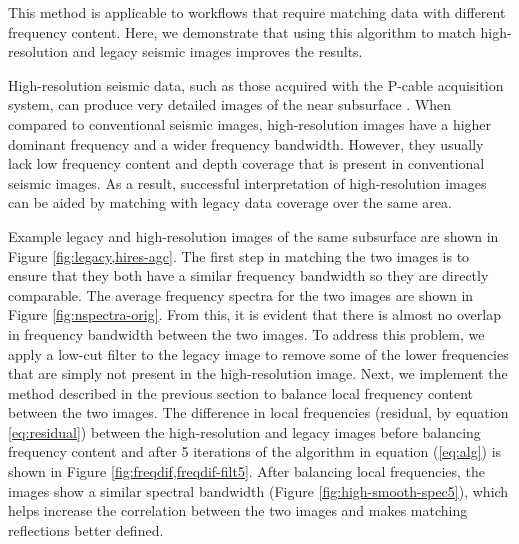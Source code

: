         This method is applicable to workflows that require matching data with different frequency content. 
        Here, we demonstrate that using this algorithm to match high-resolution and legacy seismic images improves the results.%
        
        High-resolution seismic data, such as those acquired with the P-cable acquisition system, can produce very detailed images of the near subsurface \cite[]{tip}. 
        When compared to conventional seismic images, high-resolution images have a higher dominant frequency and a wider frequency bandwidth. 
        However, they usually lack low frequency content and depth coverage that is present in conventional seismic images. 
        As a result, successful interpretation of high-resolution images can be aided by matching with legacy data coverage over the same area.



        Example legacy and high-resolution images of the same subsurface are shown in Figure \ref{fig:legacy,hires-agc}. 
        The first step in matching the two images is to ensure that they both have a similar frequency bandwidth so they are directly comparable. 
        The average frequency spectra for the two images are shown in Figure \ref{fig:nspectra-orig}. 
        From this, it is evident that there is almost no overlap in frequency bandwidth between the two images.
        To address this problem, we apply a low-cut filter to the legacy image to remove some of the lower frequencies that are simply not present in the high-resolution image. 
        Next, we implement the method described in the previous section to balance local frequency content between the two images. 
        The difference in local frequencies (residual, by equation \ref{eq:residual}) between the high-resolution and legacy images before balancing frequency content and after 5 iterations of the algorithm in equation (\ref{eq:alg}) is shown in Figure \ref{fig:freqdif,freqdif-filt5}. 
        After balancing local frequencies, the images show a similar spectral bandwidth (Figure \ref{fig:high-smooth-spec5}), which helps increase the correlation between the two images and makes matching reflections better defined.
        
